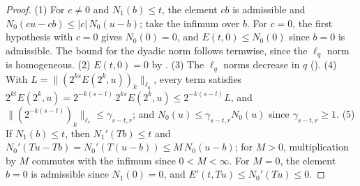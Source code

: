 \begin{proof}
\leanok
{}
(1) For $c \neq 0$ and $N_1(b) \leq t$, the element $cb$ is admissible and
$N_0(cu - cb) \leq |c| \, N_0(u - b)$; take the infimum over $b$. For $c = 0$, the first
hypothesis with $c = 0$ gives $N_0(0) = 0$, and $E(t, 0) \leq N_0(0)$ since $b = 0$ is
admissible. The bound for the dyadic norm follows termwise, since the $\ell_q$ norm is
homogeneous. (2) $E(t, 0) = 0$ by . (3) The $\ell_q$ norms decrease in
$q$ (). (4) With $L = \|(2^{ks} E(2^k, u))_k\|_{\ell_q}$, every term satisfies
$2^{kt} E(2^k, u) = 2^{-k(s-t)} \, 2^{ks} E(2^k, u) \leq 2^{-k(s-t)} L$, and
$\|(2^{-k(s-t)})_k\|_{\ell_r} \leq \gamma_{s-t, r}$; and $N_0(u) \leq \gamma_{s-t, r} N_0(u)$
since $\gamma_{s-t, r} \geq 1$. (5) If $N_1(b) \leq t$, then $N_1'(Tb) \leq t$ and
$N_0'(Tu - Tb) = N_0'(T(u - b)) \leq M \, N_0(u - b)$; for $M > 0$, multiplication by $M$
commutes with the infimum since $0 < M < \infty$. For $M = 0$, the element $b = 0$ is admissible
since $N_1(0) = 0$, and $E'(t, Tu) \leq N_0'(Tu) \leq 0$.
\end{proof}


